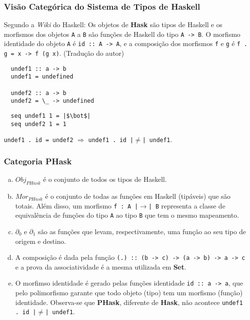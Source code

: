 \documentclass{beamer}
\begin{document}
  \begin{frame}[fragile]
    \frametitle{Vis\~ao Categ\'orica do Sistema de Tipos de Haskell}
    \begin{block}{\small{Segundo a \textit{Wiki} do Haskell:}}
Os objetos de \textbf{Hask} s\~ao tipos de Haskell e os morfismos dos objetos
  \texttt{A} a \texttt{B} s\~ao fun\c{c}\~oes de Haskell do tipo \texttt{A ->  B}.
  O morfismo identidade do objeto \texttt{A} \'e \texttt{id :: A -> A},
  e a composi\c{c}\~ao dos morfismos \texttt{f} e \texttt{g} \'e \texttt{f . g = x -> f (g x)}.  
(Tradu\c{c}\~ao do autor) 
\end{block}
\pause
\begin{verbatim}
  undef1 :: a -> b
  undef1 = undefined

  undef2 :: a -> b
  undef2 = \_ -> undefined
\end{verbatim}
\begin{verbatim}
  seq undef1 1 = |$\bot$|
  seq undef2 1 = 1
\end{verbatim}
\texttt{undef1 . id = undef2} $\Longrightarrow$
\texttt{undef1 . id |$\not =$| undef1}.
\end{frame}

\begin{frame}[fragile]
  \frametitle{Categoria \textbf{PHask}}

\begin{enumerate}[(a)]
  \item $Obj_{PHask}$ \'e o conjunto de todos os tipos de Haskell. 
  \item $Mor_{PHask}$ \'e o conjunto de todas as fun\c{c}\~oes em Haskell (tip\'aveis)
    que s\~ao totais. Al\'em disso, um morfismo \texttt{f : A |$\rightarrow$| B}
    representa a classe de equival\^encia de fun\c{c}\~oes do tipo \texttt{A} ao tipo \texttt{B} que tem o
    mesmo mapeamento.
  \item $\partial_0$ e $\partial_1$ s\~ao as fun\c{c}\~oes que levam, respectivamente, uma fun\c{c}\~ao ao seu tipo de
    origem e destino.
  \item A composi\c{c}\~ao \'e dada pela fun\c{c}\~ao \texttt{(.) :: (b -> c) -> (a -> b) -> a -> c} e a prova da associatividade
    \'e a mesma utilizada em \textbf{Set}.
  \item O morfimso identidade \'e gerado pelas fun\c{c}\~oes identidade \texttt{id :: a -> a}, que pelo polimorfismo garante que todo objeto (tipo)
    tem um morfismo (fun\c{c}\~ao) identidade. Observa-se que \textbf{PHask}, diferente de \textbf{Hask},
    n\~ao acontece 
    \texttt{undef1 . id |$\not =$| undef1}.
\end{enumerate}
\end{frame}
\end{document}
